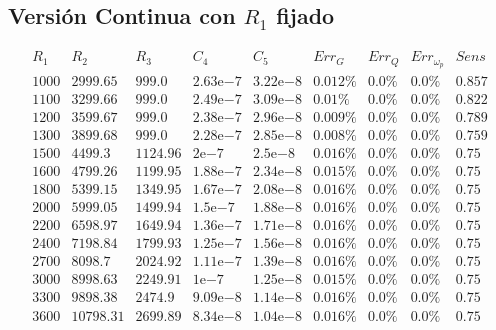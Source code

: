 \documentclass{llncs}
\newcommand{\expnumber}[2]{{#1}\mathrm{e}{#2}}
\begin{document}
		\subsection{Versión Continua con $R_1$ fijado}
		\label{subsec:ResultadosR1Fijo}
			\begin{table}[H]
			$$
			\begin{array}{|c|c|c|c|c|c|c|c|c|c|}
			\hline
			R_1 & R_2 & R_3 & C_4 & C_5 & Err_G & Err_Q & Err_{\omega_p} & Sens  \\
			\hline
			1000 & 2999.65 & 999.0 & \expnumber{2.63}{-7} & \expnumber{3.22}{-8} & 0.012\% & 0.0\% & 0.0\% & 0.857 \\
			1100 & 3299.66 & 999.0 & \expnumber{2.49}{-7} & \expnumber{3.09}{-8} & 0.01\% & 0.0\% & 0.0\% & 0.822 \\
			1200 & 3599.67 & 999.0 & \expnumber{2.38}{-7} & \expnumber{2.96}{-8} & 0.009\% & 0.0\% & 0.0\% & 0.789 \\
			1300 & 3899.68 & 999.0 & \expnumber{2.28}{-7} & \expnumber{2.85}{-8} & 0.008\% & 0.0\% & 0.0\% & 0.759 \\
			1500 & 4499.3 & 1124.96 & \expnumber{2}{-7} & \expnumber{2.5}{-8} & 0.016\% & 0.0\% & 0.0\% & 0.75 \\
			1600 & 4799.26 & 1199.95 & \expnumber{1.88}{-7} & \expnumber{2.34}{-8} & 0.015\% & 0.0\% & 0.0\% & 0.75 \\
			1800 & 5399.15 & 1349.95 & \expnumber{1.67}{-7} & \expnumber{2.08}{-8} & 0.016\% & 0.0\% & 0.0\% & 0.75 \\
			2000 & 5999.05 & 1499.94 & \expnumber{1.5}{-7} & \expnumber{1.88}{-8} & 0.016\% & 0.0\% & 0.0\% & 0.75 \\
			2200 & 6598.97 & 1649.94 & \expnumber{1.36}{-7} & \expnumber{1.71}{-8} & 0.016\% & 0.0\% & 0.0\% & 0.75 \\
			2400 & 7198.84 & 1799.93 & \expnumber{1.25}{-7} & \expnumber{1.56}{-8} & 0.016\% & 0.0\% & 0.0\% & 0.75 \\
			2700 & 8098.7 & 2024.92 & \expnumber{1.11}{-7} & \expnumber{1.39}{-8} & 0.016\% & 0.0\% & 0.0\% & 0.75 \\
			3000 & 8998.63 & 2249.91 & \expnumber{1}{-7} & \expnumber{1.25}{-8} & 0.015\% & 0.0\% & 0.0\% & 0.75 \\
			3300 & 9898.38 & 2474.9 & \expnumber{9.09}{-8} & \expnumber{1.14}{-8} & 0.016\% & 0.0\% & 0.0\% & 0.75 \\
			3600 & 10798.31 & 2699.89 & \expnumber{8.34}{-8} & \expnumber{1.04}{-8} & 0.016\% & 0.0\% & 0.0\% & 0.75 \\

\end{array}$$
\end{table}
\end{document}
